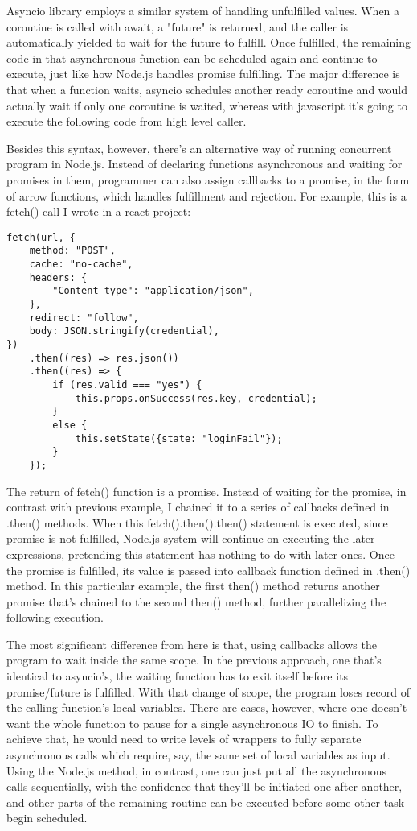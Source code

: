 \documentclass[letterpaper,twocolumn,10pt]{article}
\begin{document}
Asyncio library employs a similar system of handling unfulfilled values. 
When a coroutine is called with await, a "future" is returned, and the caller is automatically yielded to wait for the future to fulfill.
Once fulfilled, the remaining code in that asynchronous function can be scheduled again and continue to execute, just like how Node.js handles promise fulfilling.
The major difference is that when a function waits, asyncio schedules another ready coroutine and would actually wait if only one coroutine is waited, whereas with javascript it's going to execute the following code from high level caller.

Besides this syntax, however, there's an alternative way of running concurrent program in Node.js.
Instead of declaring functions asynchronous and waiting for promises in them, programmer can also assign callbacks to a promise, in the form of arrow functions, which handles fulfillment and rejection.
For example, this is a fetch() call I wrote in a react project:
\begin{lstlisting}[breaklines=true]
fetch(url, {
    method: "POST",
    cache: "no-cache",
    headers: {
        "Content-type": "application/json",
    },
    redirect: "follow",
    body: JSON.stringify(credential),
})
    .then((res) => res.json())
    .then((res) => {
        if (res.valid === "yes") {
            this.props.onSuccess(res.key, credential);
        }
        else {
            this.setState({state: "loginFail"});
        }
    });
\end{lstlisting}
The return of fetch() function is a promise.
Instead of waiting for the promise, in contrast with previous example, I chained it to a series of callbacks defined in .then() methods.
When this fetch().then().then() statement is executed, since promise is not fulfilled, Node.js system will continue on executing the later expressions, pretending this statement has nothing to do with later ones.
Once the promise is fulfilled, its value is passed into callback function defined in .then() method.
In this particular example, the first then() method returns another promise that's chained to the second then() method, further parallelizing the following execution.

The most significant difference from here is that, using callbacks allows the program to wait inside the same scope.
In the previous approach, one that's identical to asyncio's, the waiting function has to exit itself before its promise/future is fulfilled.
With that change of scope, the program loses record of the calling function's local variables.
There are cases, however, where one doesn't want the whole function to pause for a single asynchronous IO to finish.
To achieve that, he would need to write levels of wrappers to fully separate asynchronous calls which require, say, the same set of local variables as input.
Using the Node.js method, in contrast, one can just put all the asynchronous calls sequentially, with the confidence that they'll be initiated one after another, and other parts of the remaining routine can be executed before some other task begin scheduled.
\end{document}
